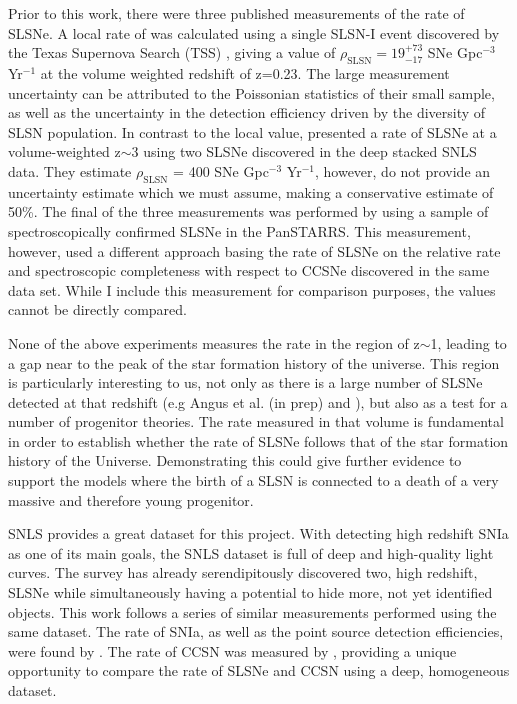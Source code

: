 Prior to this work, there were three published measurements of the rate of SLSNe. A local rate of was calculated using a single SLSN-I event discovered by the Texas Supernova Search (TSS) \citep{Quimby2014}, giving a value of $\rho_{\mathrm{SLSN}} = 19^{+73}_{-17}$ SNe Gpc$^{-3}$ Yr$^{-1}$ at the volume weighted redshift of z=0.23. The large measurement uncertainty can be attributed to the Poissonian statistics of their small sample, as well as the uncertainty in the detection efficiency driven by the diversity of SLSN population. In contrast to the local value, \citet{Cooke2012} presented a rate of SLSNe at a volume-weighted z$\sim$3 using two SLSNe discovered in the deep stacked SNLS data. They estimate $\rho_{\mathrm{SLSN}}$ = 400 SNe Gpc$^{-3}$ Yr$^{-1}$, however, do not provide an uncertainty estimate which we must assume, making a conservative estimate of 50\%. The final of the three measurements was performed by \citet{McCrum2014} using a sample of spectroscopically confirmed SLSNe in the PanSTARRS. This measurement, however, used a different approach basing the rate of SLSNe on the relative rate and spectroscopic completeness with respect to CCSNe discovered in the same data set. While I include this measurement for comparison purposes, the values cannot be directly compared.

None of the above experiments measures the rate in the region of z$\sim$1, leading to a gap near to the peak of the star formation history of the universe. This region is particularly interesting to us, not only as there is a large number of SLSNe detected at that redshift (e.g Angus et al. (in prep) and \citet{Lunnan2014}), but also as a test for a number of progenitor theories. The rate measured in that volume is fundamental in order to establish whether the rate of SLSNe follows that of the star formation history of the Universe. Demonstrating this could give further evidence to support the models where the birth of a SLSN is connected to a death of a very massive and therefore young progenitor.

SNLS provides a great dataset for this project. With detecting high redshift SNIa as one of its main goals, the SNLS dataset is full of deep and high-quality light curves. The survey has already serendipitously discovered two, high redshift, SLSNe \citep{Howell2013} while simultaneously having a potential to hide more, not yet identified objects. This work follows a series of similar measurements performed using the same dataset. The rate of SNIa, as well as the point source detection efficiencies, were found by \citet{Perrett2012}. The rate of CCSN was measured by \citet{Bazin2009}, providing a unique opportunity to compare the rate of SLSNe and CCSN using a deep, homogeneous dataset.

